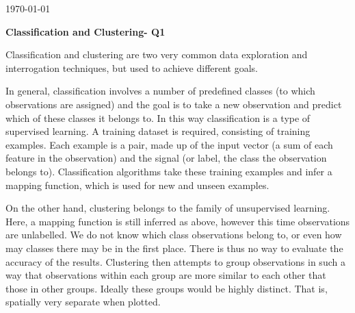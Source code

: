 \documentclass[paper=a4, fontsize=11pt]{scrartcl} %
\begin{document}
\begin{titlepage}

\vspace{5cm}

{\large \today}\\[3cm] %

\vfill %

\end{titlepage}
\clearpage
\onecolumn
\setlength{\parindent}{10ex}
\clearpage
{\noindent \bf \Large Classification and Clustering- Q1}\\
{Classification and clustering are two very common data exploration and interrogation techniques, but used to achieve different goals.
\par{In general, classification involves a number of predefined classes (to which observations are assigned) and the goal is to take a new observation and predict which of these classes it belongs to. In this way classification is a type of supervised learning. A training dataset is required, consisting of training examples. Each example is a pair, made up of the input vector (a sum of each feature in the observation) and the signal (or label, the class the observation belongs to). Classification algorithms take these training examples and infer a mapping function, which is used for new and unseen examples.}
\par{On the other hand, clustering belongs to the family of unsupervised learning. Here, a mapping function is still inferred as above, however this time observations are unlabelled. We do not know which class observations belong to, or even how may classes there may be in the first place. There is thus no way to evaluate the accuracy of the results. Clustering then attempts to group observations in such a way that observations within each group are more similar to each other that those in other groups. Ideally these groups would be highly distinct. That is, spatially very separate when plotted.  } }\\\\
\end{document}
